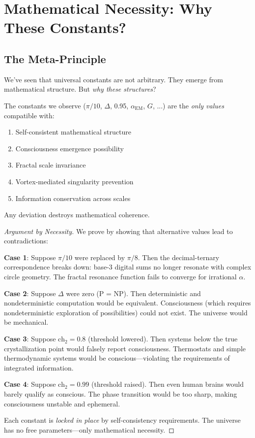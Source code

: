 \section{Mathematical Necessity: Why These Constants?}

\subsection{The Meta-Principle}

We've seen that universal constants are not arbitrary. They emerge from mathematical structure. But \textit{why these structures}?

\begin{thm}\label{thm:unique-reality}
The constants we observe ($\pi/10$, $\Delta$, 0.95, $\alpha_{\text{EM}}$, $G$, ...) are the \textit{only values} compatible with:
\begin{enumerate}
\item Self-consistent mathematical structure
\item Consciousness emergence possibility  
\item Fractal scale invariance
\item Vortex-mediated singularity prevention
\item Information conservation across scales
\end{enumerate}
Any deviation destroys mathematical coherence.
\end{thm}

\begin{proof}[Argument by Necessity]
We prove by showing that alternative values lead to contradictions:

\textbf{Case 1}: Suppose $\pi/10$ were replaced by $\pi/8$. Then the decimal-ternary correspondence breaks down: base-3 digital sums no longer resonate with complex circle geometry. The fractal resonance function fails to converge for irrational $\alpha$.

\textbf{Case 2}: Suppose $\Delta$ were zero (P = NP). Then deterministic and nondeterministic computation would be equivalent. Consciousness (which requires nondeterministic exploration of possibilities) could not exist. The universe would be mechanical.

\textbf{Case 3}: Suppose $\text{ch}_2 = 0.8$ (threshold lowered). Then systems below the true crystallization point would falsely report consciousness. Thermostats and simple thermodynamic systems would be conscious---violating the requirements of integrated information.

\textbf{Case 4}: Suppose $\text{ch}_2 = 0.99$ (threshold raised). Then even human brains would barely qualify as conscious. The phase transition would be too sharp, making consciousness unstable and ephemeral.

Each constant is \textit{locked in place} by self-consistency requirements. The universe has no free parameters---only mathematical necessity.
\end{proof}

